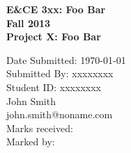 \documentclass[12pt,fleqn,reqno,letterpaper]{article}
\begin{document}
\begin{titlepage}
  \begin{center}
    \vspace*{1cm}
    {\large \bfseries E\&CE 3xx: Foo Bar\\[0.6cm]}
    {\large \bfseries Fall 2013 \\[0.4cm]}
    {\large \bfseries Project X: Foo Bar \\[0.4cm]}

    \vspace{3cm}
    \begin{minipage}{\textwidth}
    \begin{flushleft} \large
      Date Submitted: \today \\[0.5cm]
      Submitted By: xxxxxxxx \\[0.2cm]
      Student ID: xxxxxxxx \\[0.2cm]
      John Smith \\[0.2cm]
      john.smith@noname.com \\[3cm]
      Marks received: \\ [1cm]
      Marked by: \\

    \end{flushleft}
    \end{minipage}

\vfill

  \end{center}
\end{titlepage}






%
\end{document}
